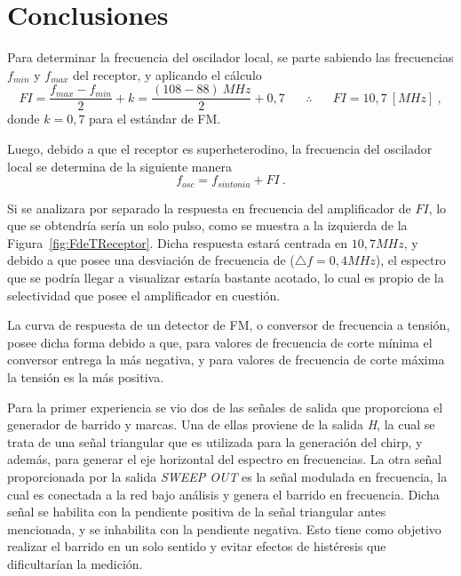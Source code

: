   \section{Conclusiones}

    Para determinar la frecuencia del oscilador local, se parte sabiendo las frecuencias 
    \(f_{min}\) y \(f_{max}\) del receptor, y
    aplicando el cálculo 
      \begin{equation*}
        FI = \dfrac{f_{max} - f_{min}}{2} + k = 
        \dfrac{(108 - 88)~MHz}{2} + 0,7 \hspace{20pt} \therefore \hspace{20pt} FI = 10,7~[MHz]~,
      \end{equation*}
    donde \(k = 0,7\) para el estándar de FM.
    
    Luego, debido a que el receptor es superheterodino, la frecuencia del oscilador local 
    se determina de la siguiente manera
      \begin{equation*}
        f_{osc} = f_{sintonia} +FI~.
      \end{equation*}

    Si se analizara por separado la respuesta en frecuencia del amplificador de \(FI\), lo que
    se obtendría sería un solo pulso, como se muestra a la izquierda de la Figura~\ref{fig:FdeTReceptor}.
    Dicha respuesta estará centrada en \(10,7 MHz\), y debido a que 
    posee una desviación de frecuencia de (\(\triangle f = 0,4 MHz\)), el espectro que
    se podría llegar a visualizar estaría bastante acotado, lo cual es propio de la 
    selectividad que posee el amplificador en cuestión.   
    
    La curva de respuesta de un detector de FM, o conversor de frecuencia a tensión, 
    posee dicha forma debido a que, para valores de frecuencia de corte mínima el 
    conversor entrega la más negativa, y para valores  de frecuencia de 
    corte máxima la tensión es la más positiva.   
    
    Para la primer experiencia se vio dos de las señales de salida que proporciona el generador de barrido
    y marcas. Una de ellas proviene de la salida \textit{H}, la cual se trata de una señal triangular que es
    utilizada para la generación del chirp, y además, para generar el eje horizontal del espectro en frecuencias.
    La otra señal proporcionada por la salida  \textit{SWEEP OUT} es la señal modulada en frecuencia, la cual es conectada
    a la red bajo análisis y genera el barrido en frecuencia. Dicha señal se habilita con la pendiente positiva
    de la señal triangular antes mencionada, y se inhabilita con la pendiente negativa. Esto tiene como objetivo
    realizar el barrido en un solo sentido y evitar efectos de histéresis que dificultarían la medición.

